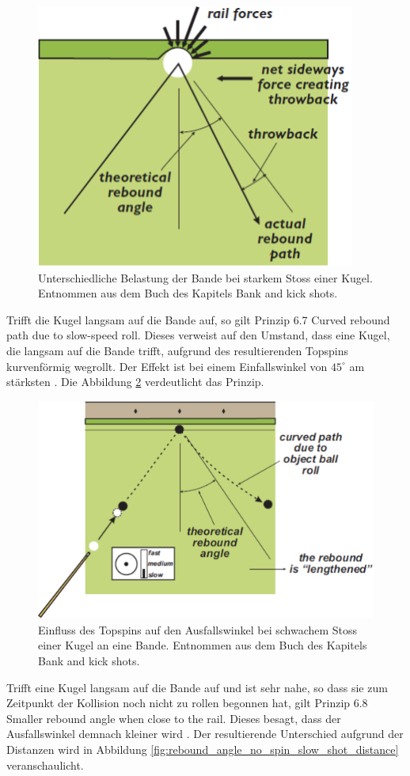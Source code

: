 \begin{figure}[h!]
    \begin{center}
        \includegraphics[width=0.3\linewidth]{../common/03_billiard_ai/resources/56_rebound_angle_no_spin_fast_shot.png}
    \end{center}
    \caption{Unterschiedliche Belastung der Bande bei starkem Stoss einer Kugel.
    Entnommen aus dem Buch \cite{book:the_ilustrated_principles_of_pool_and_billiards} des Kapitels  Bank and kick shots\grqq.}
    \label{fig:rebound_angle_no_spin_fast_shot}
\end{figure}

Trifft die Kugel langsam auf die Bande auf, so gilt Prinzip 6.7 \glqq Curved rebound path due to slow-speed roll\grqq.
Dieses verweist auf den Umstand, dass eine Kugel, die langsam auf die Bande trifft, aufgrund des resultierenden
Topspins kurvenförmig wegrollt. Der Effekt ist bei einem Einfallswinkel von $45^{\circ}$ am stärksten \cite{book:the_ilustrated_principles_of_pool_and_billiards}.
Die Abbildung \ref{fig:rebound_angle_no_spin_slow_shot} verdeutlicht das Prinzip.

\begin{figure}[h!]
    \begin{center}
        \includegraphics[width=0.4\linewidth]{../common/03_billiard_ai/resources/57_rebound_angle_no_spin_slow_shot.png}
    \end{center}
    \caption{Einfluss des Topspins auf den Ausfallswinkel bei schwachem Stoss einer Kugel an eine Bande.
    Entnommen aus dem Buch \cite{book:the_ilustrated_principles_of_pool_and_billiards} des Kapitels  Bank and kick shots\grqq.}
    \label{fig:rebound_angle_no_spin_slow_shot}
\end{figure}

Trifft eine Kugel langsam auf die Bande auf und ist sehr nahe, so dass sie zum Zeitpunkt der Kollision noch nicht zu rollen begonnen hat,
gilt Prinzip 6.8 \glqq Smaller rebound angle when close to the rail\grqq.
Dieses besagt, dass der Ausfallswinkel demnach kleiner wird \cite{book:the_ilustrated_principles_of_pool_and_billiards}.
Der resultierende Unterschied aufgrund der Distanzen wird in Abbildung \ref{fig:rebound_angle_no_spin_slow_shot_distance} veranschaulicht.

